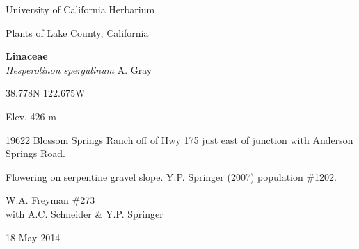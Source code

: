 \documentclass[letterpaper,10pt]{article}
\begin{document}
\begin{minipage}[t]{0.40\textwidth}

\begin{center}
University of California Herbarium \\
\begin{large}
Plants of Lake County, California \\
\end{large}
\vspace{\baselineskip}
\textbf{Linaceae} \\
\textit{Hesperolinon spergulinum} A. Gray\\
\end{center}

\begin{footnotesize}

\begin{multicols}{2}
38.778\textdegree N 122.675\textdegree W
\columnbreak
\begin{flushright}
Elev. 426 m
\end{flushright}
\end{multicols}

19622 Blossom Springs Ranch off of Hwy 175 just east of junction with Anderson Springs Road.
\vspace{\baselineskip}

Flowering on serpentine gravel slope. Y.P. Springer (2007) population \#1202.

\begin{multicols}{2}
W.A. Freyman \#273 \\
with A.C. Schneider \& Y.P. Springer
\columnbreak
\begin{flushright}
18 May 2014
\end{flushright}
\end{multicols}

\end{footnotesize}

\end{minipage}
%
\hspace{2cm}
%
\end{document}
